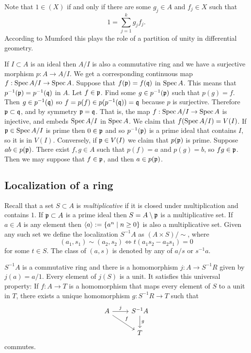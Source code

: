 Note that $1 \in (X)$ if and only if there are some $g_j \in A$ and $f_j \in X$ such that
\[
1 = \sum_{j=1}^k g_j f_j.
\]
According to Mumford this plays the role of a partition of unity in differential geometry.






\begin{exam}
If $I \subset A$ is an ideal then $A/I$ is also a commutative ring and we have a surjective morphism $p : A \to A/I$.
We get a corresponding continuous map $f : \operatorname{Spec} A/I \to \operatorname{Spec} A$.
Suppose that $f(\mathfrak{p}) = f(\mathfrak{q})$ in $\operatorname{Spec} A$.
This means that $p^{-1}(\mathfrak{p}) = p^{-1}(\mathfrak{q})$ in $A$.
Let $f \in \mathfrak{p}$.
Find some $g \in p^{-1}(\mathfrak{p})$ such that $p(g) = f$.
Then $g \in p^{-1}(\mathfrak{q})$ so $f = p(f) \in p(p^{-1}(\mathfrak{q})) = \mathfrak{q}$ because $p$ is surjective.
Therefore $\mathfrak{p} \subset \mathfrak{q}$, and by symmetry $\mathfrak{p} = \mathfrak{q}$.
That is, the map $f : \operatorname{Spec} A/I \to \operatorname{Spec} A$ is injective, and embeds $\operatorname{Spec} A/I$ in $\operatorname{Spec} A$.
We claim that $f(\operatorname{Spec} A/I) = V(I)$.
If $\mathfrak{p} \in \operatorname{Spec} A/I$ is prime then $0 \in \mathfrak{p}$ and so $p^{-1}(\mathfrak{p})$ is a prime ideal that contains $I$, so it is in $V(I)$.
Conversely, if $\mathfrak{p} \in V(I)$ we claim that $p(\mathfrak{p})$ is prime.
Suppose $ab \in p(\mathfrak{p})$.
There exist $f,g \in A$ such that $p(f) = a$ and $p(g) = b$, so $fg \in \mathfrak{p}$.
Then we may suppose that $f \in \mathfrak{p}$, and then $a \in p(\mathfrak{p})$.
\end{exam}




\subsection*{Localization of a ring}

Recall that a set $S \subset A$ is \emph{multiplicative} if it is closed under multiplication and contains $1$.
If $\mathfrak{p} \subset A$ is a prime ideal then $S = A \setminus \mathfrak{p}$ is a multiplicative set.
If $a \in A$ is any element then $\langle a \rangle := \{a^n \mid n \geq 0\}$ is also a multiplicative set.
Given any such set we define the localization $S^{-1}A$ as $(A \times S) / \sim$, where
\[
(a_1, s_1) \sim (a_2, s_2)
\iff
t(a_1 s_2 - a_2 s_1) = 0
\]
for some $t \in S$.
The class of $(a,s)$ is denoted by any of $a/s$ or $s^{-1}a$.

\begin{prop}
$S^{-1}A$ is a commutative ring and there is a homomorphism $j : A \to S^{-1}R$ given by $j(a) = a/1$.
Every element of $j(S)$ is a unit.
It satisfies this universal property:
If $f : A \to T$ is a homomorphism that maps every element of $S$ to a unit in $T$, there exists a unique homomorphism $g : S^{-1}R \to T$ such that
\[
\begin{tikzcd}
A \ar[r,"j"] \ar[rd,"f"] &
S^{-1}A \ar[d,"g"]
\\
& T
\end{tikzcd}
\]
commutes.
\end{prop}


